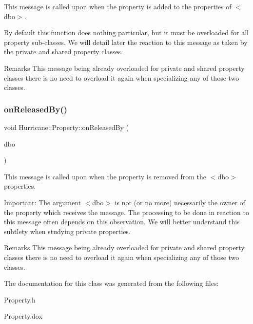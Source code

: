 This message is called upon when the property is added to the properties of {\ttfamily $<$dbo$>$}.

By default this function does nothing particular, but it must be overloaded for all property sub-\/classes. We will detail later the reaction to this message as taken by the private and shared property classes.

\begin{DoxyRemark}{Remarks}
This message being already overloaded for private and shared property classes there is no need to overload it again when specializing any of those two classes. 
\end{DoxyRemark}
\mbox{\label{classHurricane_1_1Property_a0ea7ee2089f1463c0c16e30313b54083}} 
\subsubsection{\texorpdfstring{on\+Released\+By()}{onReleasedBy()}}
{\footnotesize\ttfamily void Hurricane\+::\+Property\+::on\+Released\+By (\begin{DoxyParamCaption}\item[{\mbox{\hyperlink{classHurricane_1_1DBo}{D\+Bo}} $\ast$}]{dbo }\end{DoxyParamCaption})\hspace{0.3cm}{\ttfamily [pure virtual]}}

This message is called upon when the property is removed from the {\ttfamily $<$dbo$>$} properties.

\begin{DoxyParagraph}{Important\+: The argument {\ttfamily $<$dbo$>$} is not (or no more) necessarily the }
owner of the property which receives the message. The processing to be done in reaction to this message often depends on this observation. We will better understand this subtlety when studying private properties.
\end{DoxyParagraph}
\begin{DoxyRemark}{Remarks}
This message being already overloaded for private and shared property classes there is no need to overload it again when specializing any of those two classes. 
\end{DoxyRemark}


The documentation for this class was generated from the following files\+:\begin{DoxyCompactItemize}
\item 
Property.\+h\item 
Property.\+dox\end{DoxyCompactItemize}
